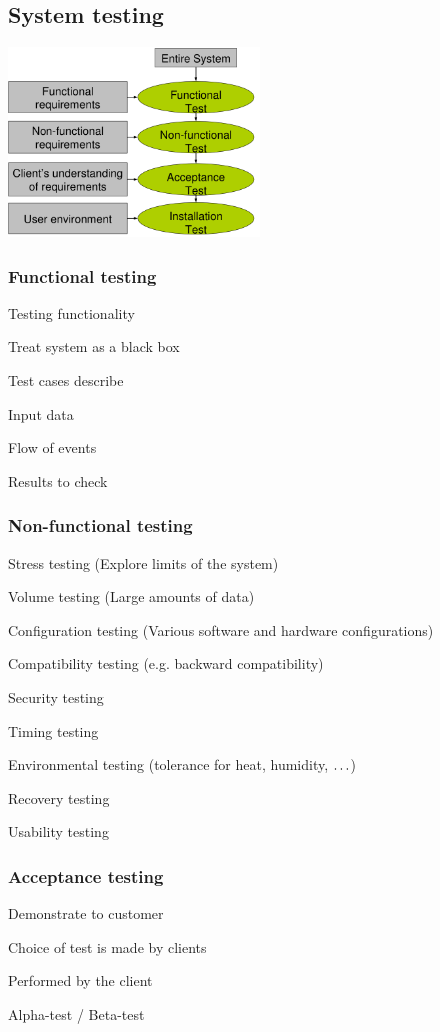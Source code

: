 \subsection{System testing}
\includegraphics[width=0.5\textwidth]{img/system_testing.png}

\subsubsection{Functional testing}
\enumstart
	\item Testing functionality
	\item Treat system as a black box
	\item Test cases describe
	\enumstart
		\item Input data
		\item Flow of events
		\item Results to check
	\enumend
\enumend

\subsubsection{Non-functional testing}
\enumstart
	\item Stress testing (Explore limits of the system)
	\item Volume testing (Large amounts of data)
	\item Configuration testing (Various software and hardware configurations)
	\item Compatibility testing (e.g. backward compatibility)
	\item Security testing
	\item Timing testing
	\item Environmental testing (tolerance for heat, humidity, $\mathellipsis$)
	\item Recovery testing
	\item Usability testing
\enumend

\subsubsection{Acceptance testing}
\enumstart
	\item Demonstrate to customer
	\item Choice of test is made by clients
	\item Performed by the client
	\item Alpha-test / Beta-test
\enumend

